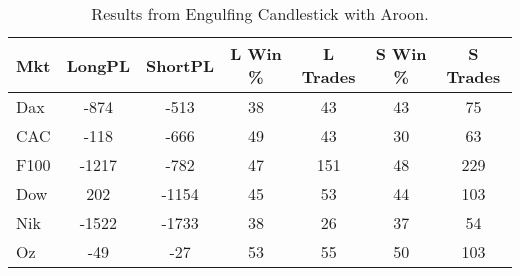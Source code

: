 \begin{table}[ht]
\centering
\caption[Engulfing Candlestick System with Aroon]{Results from Engulfing Candlestick with Aroon.} 
\label{tab:engulf_aroon_results}
\begin{tabular}{lcccccc}
  \toprule Mkt & LongPL & ShortPL & L Win \% & L Trades & S Win \% & S Trades \\ 
  \midrule Dax & -874 & -513 & 38 & 43 & 43 & 75 \\ 
  CAC & -118 & -666 & 49 & 43 & 30 & 63 \\ 
  F100 & -1217 & -782 & 47 & 151 & 48 & 229 \\ 
  Dow & 202 & -1154 & 45 & 53 & 44 & 103 \\ 
  Nik & -1522 & -1733 & 38 & 26 & 37 & 54 \\ 
  Oz & -49 & -27 & 53 & 55 & 50 & 103 \\ 
   \bottomrule \end{tabular}
\end{table}
